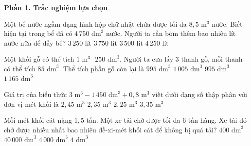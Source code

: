 \textbf{Phần 1. Trắc nghiệm lựa chọn}

\begin{ex} %
Một bể nước ngầm dạng hình hộp chữ nhật chứa được tối đa $8{,}5\text{ m}^3$ nước. Biết hiện tại trong bể đã có $4\,750\text{ dm}^3$ nước. Người ta cần bơm thêm bao nhiêu lít nước nữa để đầy bể?
\choice
{$3\,250\text{ lít}$}
{\True $3\,750\text{ lít}$}
{$3\,500\text{ lít}$}
{$4\,250\text{ lít}$}
\end{ex}

\begin{ex} %
Một khối gỗ có thể tích $1\text{ m}^3\text{ }250\text{ dm}^3$. Người ta cưa lấy $3$ thanh gỗ, mỗi thanh có thể tích $85\text{ dm}^3$. Thể tích phần gỗ còn lại là
\choice
{$995\text{ dm}^3$}
{$1\,005\text{ dm}^3$}
{\True $995\text{ dm}^3$}
{$1\,165\text{ dm}^3$}
\end{ex}

\begin{ex} %
Giá trị của biểu thức $3\text{ m}^3 - 1\,450\text{ dm}^3 + 0{,}8\text{ m}^3$ viết dưới dạng số thập phân với đơn vị mét khối là
\choice
{$2{,}45\text{ m}^3$}
{\True $2{,}35\text{ m}^3$}
{$2{,}25\text{ m}^3$}
{$3{,}35\text{ m}^3$}
\end{ex}

\begin{ex} %
Mỗi mét khối cát nặng $1{,}5$ tấn. Một xe tải chở được tối đa $6$ tấn hàng. Xe tải đó chở được nhiều nhất bao nhiêu đề-xi-mét khối cát để không bị quá tải?
\choice
{$400\text{ dm}^3$}
{$40\,000\text{ dm}^3$}
{\True $4\,000\text{ dm}^3$}
{$4\text{ dm}^3$}
\end{ex}


